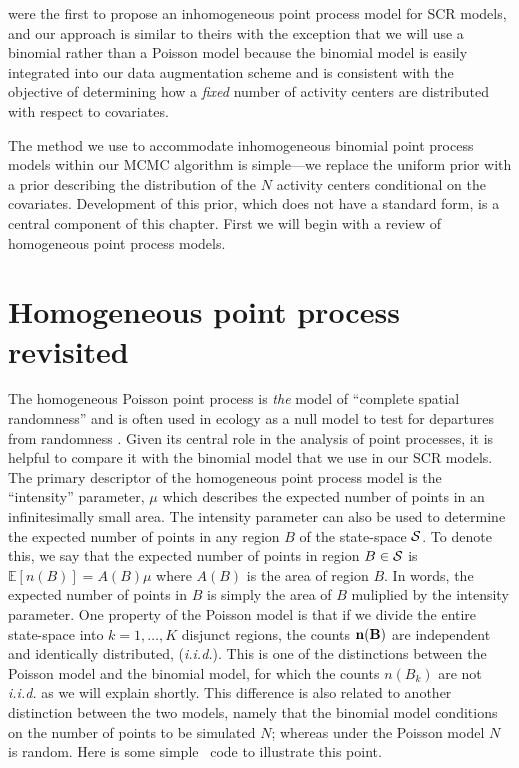 \citet{borchers_efford:2008} were the first to propose an
inhomogeneous point process model for SCR models, and our approach is
similar to theirs with the exception that we will use a binomial
rather than a Poisson model because the binomial model is
easily integrated into our data augmentation scheme and is consistent
with the objective of determining how a {\it fixed} number of activity
centers are distributed with respect to covariates.

The method we use to accommodate inhomogeneous binomial point process
models within our MCMC algorithm is simple---we
replace the uniform prior with a prior describing the
distribution of the $N$ activity centers conditional on the
covariates. Development of this prior, which does not have a
standard form, is a central component of this chapter. First we will
begin with a review of homogeneous point process models.


\section{Homogeneous point process revisited}

The homogeneous Poisson point process is \emph{the} model of ``complete
spatial randomness'' and is often used in ecology as a null model
to test for departures from randomness
\citep{diggle:2003,illian_etal:2008}. Given its central role in the
analysis of point processes, it is helpful to compare it with
the binomial model that we use in our SCR models. The
primary descriptor of the homogeneous point process model is the
``intensity'' parameter, $\mu$ which describes the expected number
of points in an infinitesimally small area. The intensity
parameter can also be used to determine the expected number of points
in any region $B$ of the state-space $\cal{S}$. To denote this, we say
that the expected number of points in region $B \in \cal{S}$ is
$\mathbb{E}[n(B)] = A(B)\mu$ where $A(B)$ is the area of region $B$.  In words,
the expected number of points in $B$ is simply the area of $B$
muliplied by the intensity parameter. One property
of the Poisson model is that if we divide the entire state-space into
$k=1,\dots,K$ disjunct regions, the counts $\bf n(B)$ are
independent and identically distributed, ({\it i.i.d.}). This is one
of the distinctions between the Poisson model and the binomial model,
for which the counts $n(B_k)$ are not {\it i.i.d.} as we will explain
shortly. This difference is also related to another distinction
between the two models, namely that the binomial model
conditions on the number of points to be simulated $N$; whereas under
the Poisson model $N$ is random. Here is some simple \R~code to
illustrate this point.

